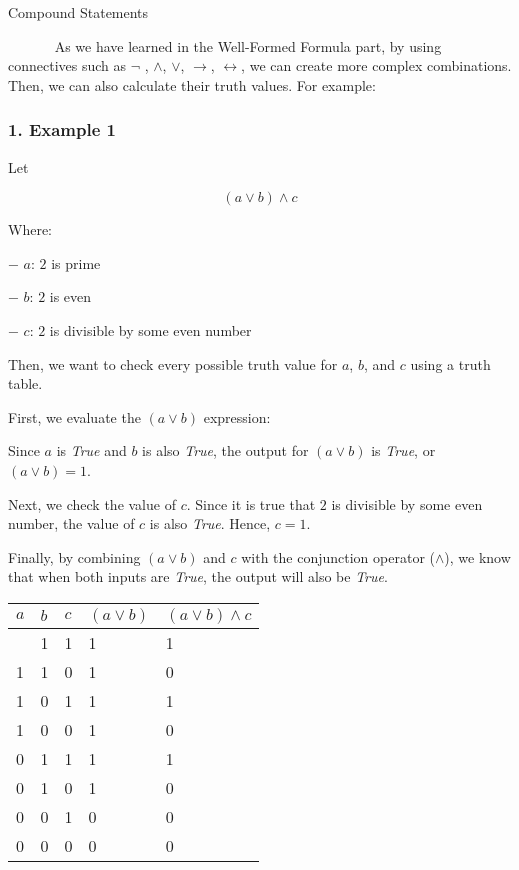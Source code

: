 Compound Statements

~~~~~~ As we have learned in the Well-Formed Formula part, by using
connectives such as \(\neg\) , \(\land\), \(\lor\), \(\rightarrow\),
\(\leftrightarrow\), we can create more complex combinations. Then, we
can also calculate their truth values. For example:

\subsubsection{1. Example 1}\label{example-1}

Let

\[(a \lor b) \land c\]

Where:

− \(a\): \(2\) is prime

− \(b\): \(2\) is even

− \(c\): \(2\) is divisible by some even number

Then, we want to check every possible truth value for \(a\), \(b\), and
\(c\) using a truth table.

First, we evaluate the \((a \lor b)\) expression:

Since \(a\) is \emph{True} and \(b\) is also \emph{True}, the output for
\((a \lor b)\) is \emph{True}, or \((a \lor b) = 1\).

Next, we check the value of \(c\). Since it is true that \(2\) is
divisible by some even number, the value of \(c\) is also \emph{True}.
Hence, \(c = 1\).

Finally, by combining \((a \lor b)\) and \(c\) with the conjunction
operator (\(\land\)), we know that when both inputs are \emph{True}, the
output will also be \emph{True}.

\begin{longtable}[]{@{}lllll@{}}
\toprule\noalign{}
\(a\) & \(b\) & \(c\) & \((a \lor b)\) & \((a \lor b) \land c\) \\
\midrule\noalign{}
\endhead
\bottomrule\noalign{}
\endlastfoot
1 & 1 & 1 & 1 & 1 \\
1 & 1 & 0 & 1 & 0 \\
1 & 0 & 1 & 1 & 1 \\
1 & 0 & 0 & 1 & 0 \\
0 & 1 & 1 & 1 & 1 \\
0 & 1 & 0 & 1 & 0 \\
0 & 0 & 1 & 0 & 0 \\
0 & 0 & 0 & 0 & 0 \\
\end{longtable}

